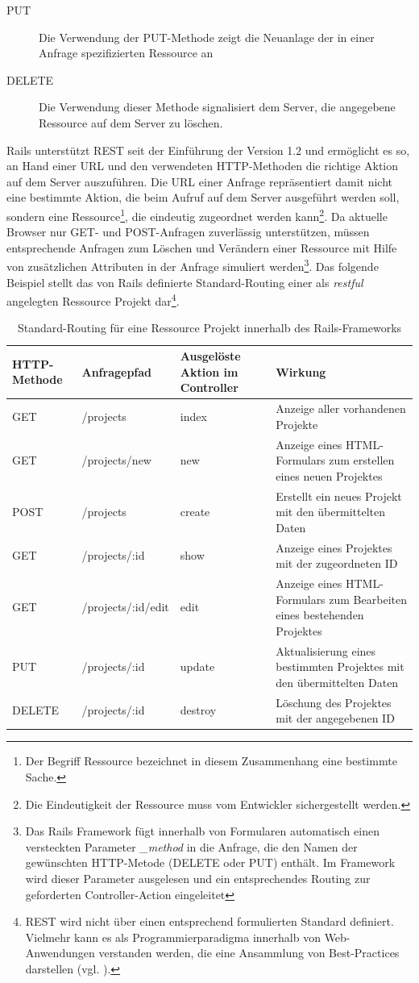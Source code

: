 \begin{description}
\item[PUT]
	Die Verwendung der PUT-Methode zeigt die Neuanlage der in einer	Anfrage spezifizierten Ressource an
\item[DELETE]
	Die Verwendung dieser Methode signalisiert dem Server, die angegebene Ressource auf dem Server zu löschen.
\end{description}
Rails unterstützt REST seit der Einführung der Version 1.2 und ermöglicht es so, an Hand einer URL und den verwendeten HTTP-Methoden die richtige Aktion auf dem Server auszuführen. Die URL einer Anfrage repräsentiert damit nicht eine bestimmte Aktion, die beim Aufruf auf dem Server ausgeführt werden soll, sondern eine Ressource\footnote{Der Begriff Ressource bezeichnet in diesem Zusammenhang eine bestimmte Sache.}, die eindeutig zugeordnet werden kann\footnote{Die Eindeutigkeit der Ressource muss vom Entwickler sichergestellt werden.}.
Da aktuelle Browser nur GET- und POST-Anfragen zuverlässig unterstützen, müssen entsprechende Anfragen zum Löschen und Verändern einer Ressource mit Hilfe von zusätzlichen Attributen in der Anfrage simuliert werden\footnote{Das Rails Framework fügt  innerhalb von Formularen automatisch einen versteckten Parameter \emph{\_method} in die Anfrage, die den Namen der gewünschten HTTP-Metode (DELETE oder PUT) enthält. Im Framework wird dieser Parameter ausgelesen und ein entsprechendes Routing zur geforderten Controller-Action eingeleitet}. Das folgende Beispiel stellt das von Rails definierte Standard-Routing einer als \emph{restful} angelegten Ressource Projekt dar\footnote{REST wird nicht über einen entsprechend formulierten Standard definiert. Vielmehr kann es als Programmierparadigma innerhalb von Web-Anwendungen verstanden werden, die eine Ansammlung von Best-Practices darstellen (vgl. \cite{restful}).}.

\begin{table}[!h]
\caption{Standard-Routing für eine Ressource Projekt innerhalb des Rails-Frameworks}
\center
\begin{tabular}[!ht]{|p{2cm}|p{3cm}|p{3cm}|p{6cm}|}
\hline
HTTP-Methode & Anfragepfad & Ausgelöste Aktion im Controller & Wirkung\\
\hline
GET	& /projects & index & Anzeige aller vorhandenen Projekte\\
\hline
GET	& /projects/new	& new &	Anzeige eines HTML-Formulars zum erstellen eines neuen Projektes\\
\hline
POST & /projects & create & Erstellt ein neues Projekt mit den übermittelten Daten\\
\hline
GET & /projects/:id &	show &	Anzeige eines Projektes mit der zugeordneten ID\\
\hline
GET	& /projects/:id/edit & edit & Anzeige eines HTML-Formulars zum Bearbeiten eines bestehenden Projektes\\
\hline
PUT	& /projects/:id &	update & Aktualisierung eines bestimmten Projektes mit den übermittelten Daten\\
\hline
DELETE & /projects/:id &	destroy &	Löschung des Projektes mit der angegebenen ID\\
\hline
\end{tabular}
\end{table}


